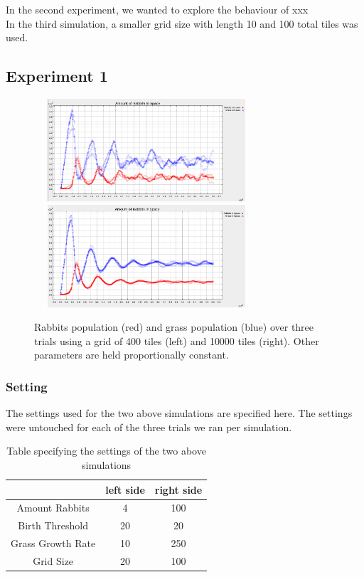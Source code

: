 \documentclass[11pt]{article}
\begin{document}
In the second experiment, we wanted to explore the behaviour of xxx\\

In the third simulation, a smaller grid size with length 10 and 100 total tiles was used.\\

\subsection{Experiment 1}
\begin{figure}[h]
	\centering
	\includegraphics[height=1.5in,width=3.3in]{ex2}
	\includegraphics[height=1.5in,width=3.3in]{ex1}
	\caption{Rabbits population (red) and grass population (blue) over three trials using a grid of 400 tiles (left) and 10000 tiles (right). Other parameters are held proportionally constant.}
	\label{figure:1}
\end{figure}
\subsubsection{Setting}

The settings used for the two above simulations are specified here. The settings were untouched for each of the three trials we ran per simulation.\\

\begin{table}[h]
	\centering
	\begin{tabular}{ | c | c | c | } 
		\hline
		\qquad & left side & right side \\ 
		\hline
		Amount Rabbits & 4 & 100 \\ 
		\hline
		Birth Threshold & 20 & 20 \\
		\hline
		Grass Growth Rate & 10 & 250 \\
		\hline
		Grid Size & 20 & 100 \\  
		\hline
	\end{tabular}
	\caption{Table specifying the settings of the two above simulations}
	\label{table:1}
\end{table}
\end{document}
